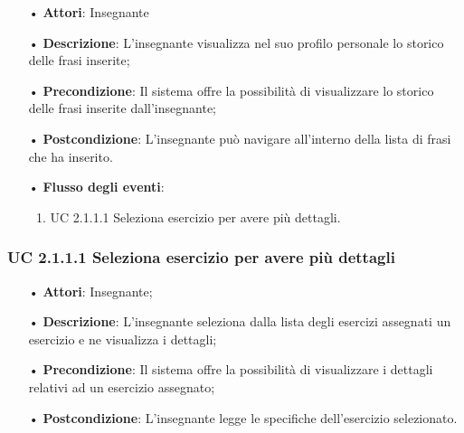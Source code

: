 \begin{itemize}
	\item[•] \textbf{Attori}:  Insegnante	   \item[•] \textbf{Descrizione}: L’insegnante visualizza nel suo profilo personale lo storico delle frasi inserite; 
	\item[•] \textbf{Precondizione}: Il sistema offre la possibilità di visualizzare lo storico delle frasi inserite dall’insegnante;
	\item[•] \textbf{Postcondizione}:  L’insegnante può navigare all’interno della lista di frasi che ha inserito.
	\item[•] \textbf{Flusso degli eventi}:
		\begin{enumerate}
			\item UC 2.1.1.1  Seleziona esercizio per avere più dettagli.
		\end{enumerate}
\end{itemize}

\subsubsection{UC 2.1.1.1 Seleziona esercizio per avere più dettagli}
\begin{itemize}
	\item[•] \textbf{Attori}: Insegnante;
	\item[•] \textbf{Descrizione}:  L’insegnante seleziona dalla lista degli esercizi assegnati un esercizio e ne visualizza i dettagli;
	\item[•] \textbf{Precondizione}: Il sistema offre la possibilità di visualizzare i dettagli relativi ad un esercizio assegnato;
	\item[•] \textbf{Postcondizione}: L’insegnante legge le specifiche dell’esercizio selezionato.
\end{itemize}

